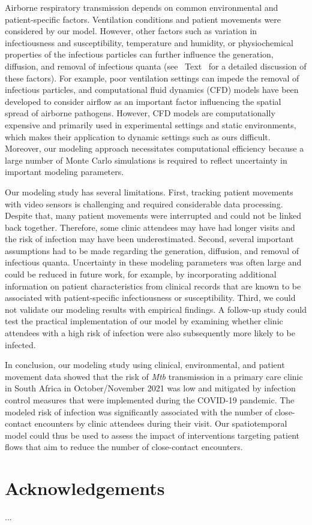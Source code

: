 \documentclass[fleqn,11pt]{wlscirep}
\begin{document}
Airborne respiratory transmission depends on common environmental and patient-specific factors.  Ventilation conditions and patient movements were considered by our model. However, other factors such as variation in infectiousness and susceptibility, temperature and humidity, or physiochemical properties of the infectious particles can further influence the generation, diffusion, and removal of infectious quanta (see \supp~Text~ for a detailed discussion of these factors). For example, poor ventilation settings can impede the removal of infectious particles\cite{Li2021BuildEnv}, and computational fluid dynamics (CFD) models have been developed to consider airflow as an important factor influencing the spatial spread of airborne pathogens\cite{Vuorinen2020SafSci,Jung2021InfectChemo,Li2021BuildEnv,Yan2023BE,Qian2009BE,Li2022SOTTE}. However, CFD models are computationally expensive and primarily used in experimental settings and static environments, which makes their application to dynamic settings such as ours difficult. Moreover, our modeling approach necessitates computational efficiency because a large number of Monte Carlo simulations is required to reflect uncertainty in important modeling parameters. 

Our modeling study has several limitations. First, tracking patient movements with video sensors is challenging and required considerable data processing. Despite that, many patient movements were interrupted and could not be linked back together. Therefore, some clinic attendees may have had longer visits and the risk of infection may have been underestimated. Second, several important assumptions had to be made regarding the generation, diffusion, and removal of infectious quanta. Uncertainty in these modeling parameters was often large and could be reduced in future work, for example, by incorporating additional information on patient characteristics from clinical records that are known to be associated with patient-specific infectiousness\cite{Escombe2008PLoSMed} or susceptibility\cite{Furin2019Lancet}. Third, we could not validate our modeling results with empirical findings. A follow-up study could test the practical implementation of our model by examining whether clinic attendees with a high risk of infection were also subsequently more likely to be infected.  

In conclusion, our modeling study using clinical, environmental, and patient movement data showed that the risk of \emph{Mtb} transmission in a primary care clinic in South Africa in October/November 2021 was low and mitigated by infection control measures that were implemented during the COVID-19 pandemic. The modeled risk of infection was significantly associated with the number of close-contact encounters by clinic attendees during their visit. Our spatiotemporal model could thus be used to assess the impact of interventions targeting patient flows that aim to reduce the number of close-contact encounters. 


\newpage


\section*{Acknowledgements}
...


\end{document}
